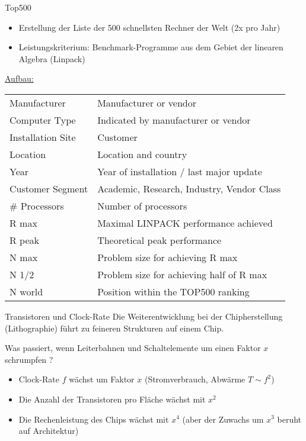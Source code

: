 \begin{bonus}{Top500}
    \begin{itemize}
        \item Erstellung der Liste der 500 schnellsten Rechner der Welt (2x pro Jahr)
        \item Leistungskriterium: Benchmark-Programme aus dem Gebiet der linearen Algebra (Linpack)
    \end{itemize}
    \underline{Aufbau:}\\
    \begin{tabularx}{\textwidth}{l|X}
        Manufacturer      & Manufacturer or vendor                     \\
        Computer Type     & Indicated by manufacturer or vendor        \\
        Installation Site & Customer                                   \\
        Location          & Location and country                       \\
        Year              & Year of installation / last major update   \\
        Customer Segment  & Academic, Research, Industry, Vendor Class \\
        \# Processors     & Number of processors                       \\
        R max             & Maximal LINPACK performance achieved       \\
        R peak            & Theoretical peak performance               \\
        N max             & Problem size for achieving R max           \\
        N 1/2             & Problem size for achieving half of R max   \\
        N world           & Position within the TOP500 ranking         \\
    \end{tabularx}
\end{bonus}

\begin{bonus}{Transistoren und Clock-Rate}
    Die Weiterentwicklung bei der Chipherstellung (Lithographie) führt zu feineren Strukturen auf einem Chip.
    
    Was passiert, wenn Leiterbahnen und Schaltelemente um einen Faktor $x$ schrumpfen ?
    \begin{itemize}
        \item Clock-Rate $f$ wächst um Faktor $x$ (Stromverbrauch, Abwärme $T \sim f^2$)
        \item Die Anzahl der Transistoren pro Fläche wächst mit $x^2$
        \item Die Rechenleistung des Chips wächst mit $x^4$ (aber der Zuwachs um $x^3$ beruht auf Architektur)
    \end{itemize}
\end{bonus}

